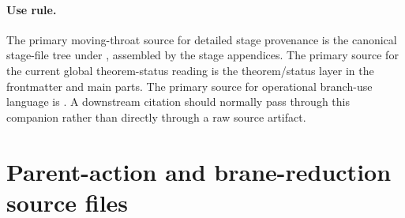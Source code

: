 \paragraph{Use rule.}
The primary moving-throat source for detailed stage provenance is the canonical
stage-file tree under , assembled by the stage
appendices.  The primary source for the current global theorem-status reading is
the theorem/status layer in the frontmatter and main parts.  The primary source
for operational branch-use language is .  A downstream citation
should normally pass through this companion rather than directly through a raw
source artifact.

\section{Parent-action and brane-reduction source files}
\label{sec:parent-action-source-files}

